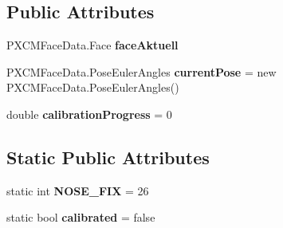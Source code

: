 \subsection*{Public Attributes}
\begin{DoxyCompactItemize}
\item 
\mbox{\label{class_real_sense_1_1_model_ad4e469e9cf474c5f813a757be1eaf55d}} 
P\+X\+C\+M\+Face\+Data.\+Face {\bfseries face\+Aktuell}
\item 
\mbox{\label{class_real_sense_1_1_model_aa6e241f22bac2dbdefdceef6e4cf0202}} 
P\+X\+C\+M\+Face\+Data.\+Pose\+Euler\+Angles {\bfseries current\+Pose} = new P\+X\+C\+M\+Face\+Data.\+Pose\+Euler\+Angles()
\item 
\mbox{\label{class_real_sense_1_1_model_a8573a7d01db1fb8a29f5873a717373bc}} 
double {\bfseries calibration\+Progress} = 0
\end{DoxyCompactItemize}
\subsection*{Static Public Attributes}
\begin{DoxyCompactItemize}
\item 
\mbox{\label{class_real_sense_1_1_model_a2f289c39689e5de8feeb82dcfb708170}} 
static int {\bfseries N\+O\+S\+E\+\_\+\+F\+IX} = 26
\item 
\mbox{\label{class_real_sense_1_1_model_af0a605c0cc3c8739836a4e98ac06b864}} 
static bool {\bfseries calibrated} = false
\end{DoxyCompactItemize}

